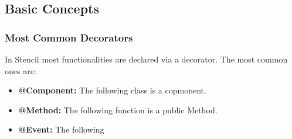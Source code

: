 \subsection{Basic Concepts}
\subsubsection{Most Common Decorators}
In Stencil most functionalities are declared via a decorator. The most common ones are:
\begin{itemize}
\item \textbf{@Component:} The following class is a copmonent.
\item \textbf{@Method:} The following function is a public Method.
\item \textbf{@Event:} The following 
\end{itemize}



